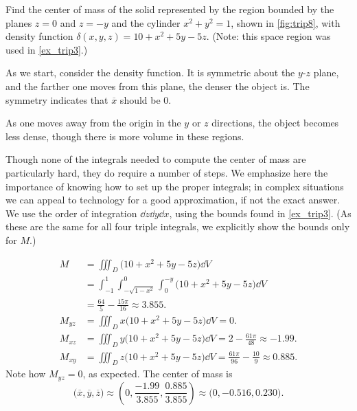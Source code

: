 \begin{example}\label{ex_trip8}
Find the center of mass of the solid represented by the region bounded by the planes $z=0$ and $z=-y$ and the cylinder $x^2+y^2=1$, shown in \autoref{fig:trip8}, with density function $\delta(x,y,z) = 10+x^2+5y-5z$. (Note: this space region was used in \autoref{ex_trip3}.)

\solution
As we start, consider the density function. It is symmetric about the $y$-$z$ plane, and the farther one moves from this plane, the denser the object is. The symmetry indicates that $\overline x$ should be 0. 

As one moves away from the origin in the $y$ or $z$ directions, the object becomes less dense, though there is more volume in these regions.  

Though none of the integrals needed to compute the center of mass are particularly hard, they do require a number of steps. We emphasize here the importance of knowing how to set up the proper integrals; in complex situations we can appeal to technology for a good approximation, if not the exact answer. We use the order of integration $\dd z\dd y\dd x$, using the bounds found in \autoref{ex_trip3}. (As these are the same for all four triple integrals, we explicitly show the bounds only for $M$.)

\begin{align*}
	M
	&= \iiint_D \bigl(10+x^2+5y-5z\bigr)\dd V \\
	&= \int_{-1}^1\int_{-\sqrt{1-x^2}}^0\int_0^{-y} \bigl(10+x^2+5y-5z\bigr)\dd V\\
	&= \frac{64}5-\frac{15\pi}{16} \approx 3.855.\\
	M_{yz}
	&= \iiint_D x\bigl(10+x^2+5y-5z\bigr)\dd V = 0.\\
	M_{xz}
	&= \iiint_D y\bigl(10+x^2+5y-5z\bigr)\dd V = 2-\frac{61\pi}{48}\approx -1.99.\\
	M_{xy}
	&= \iiint_D z\bigl(10+x^2+5y-5z\bigr)\dd V = \frac{61\pi}{96}-\frac{10}9\approx 0.885.
\end{align*}
Note how $M_{yz}=0$, as expected. The center of mass is
\[
\bigl(\overline{x},\overline{y},\overline{z}\bigr)
\approx \left(0,\frac{-1.99}{3.855},\frac{0.885}{3.855}\right) \approx \bigl(0,-0.516, 0.230\bigr).
\]
\end{example}

